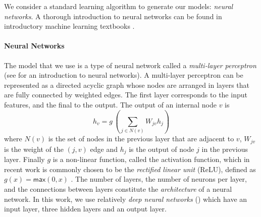We consider a standard learning algorithm to generate our models: \emph{neural
networks}. A thorough introduction to neural networks can be found in
introductory machine learning textbooks \citep[\eg][]{Hastie2009-bn}.



\paragraph{Neural Networks}
The model that we use is a type of neural network called a \emph{multi-layer
perceptron} (see \citep{Nielsen2015-pu} for an introduction to neural networks).
A multi-layer perceptron can be represented as a directed acyclic graph whose
nodes are arranged in layers that are fully connected by weighted edges. The
first layer corresponds to the input features, and the final to the output. The
output of an internal node $v$ is
\[ h_v = g\,(\sum_{j \in N(v)}\!W_{jv} h_j ) \] where $N(v)$ is the set of nodes
in the previous layer that are adjacent to $v$, $W_{jv}$ is the weight of the
$(j, v)$ edge and $h_j$ is the output of node $j$ in the previous layer. Finally
$g$ is a non-linear function, called the activation function, which in recent
work is commonly chosen to be the \emph{rectified linear unit} (ReLU), defined
as $g(x) = \mathsf{max}(0,x)$ \citep{Nair2010-xg}. The number of layers, the
number of neurons per layer, and the connections between layers constitute the
\emph{architecture} of a neural network. In this work, we use relatively
\emph{deep neural networks} (\dnn) which have an input layer, three hidden
layers and an output layer.


